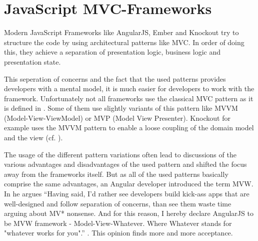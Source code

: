 \section{JavaScript MVC-Frameworks}

Modern JavaScript Frameworks like AngularJS, Ember and Knockout try to structure the code by using architectural patterns like MVC.
In order of doing this, they achieve a separation of presentation logic, business logic and presentation state.

This seperation of concerns and the fact that the used patterns provides developers with a mental model, it is much easier for developers to work with the framework.
Unfortunately not all frameworks use the classical MVC pattern as it is defined in \autocite[]{smalltalk_mvc}.
Some of them use slightly variants of this pattern like MVVM (Model-View-ViewModel) or MVP (Model View Presenter).
Knockout for example uses the MVVM pattern to enable a loose coupling of the domain model and the view (cf.
\autocite{heise_knockout}).
 
The usage of the different pattern variations often lead to discussions of the various advantages and disadvantages of the used pattern and shifted the focus away from the frameworks itself.
But as all of the used patterns basically comprise the same advantages, an Angular developer introduced the term MVW.
In \autocite{anguler_mvw} he argues \enquote{Having said, I'd rather see developers build kick-ass apps that are well-designed and follow separation of concerns, than see them waste time arguing about MV* nonsense.
And for this reason, I hereby declare AngularJS to be MVW framework - Model-View-Whatever.
Where Whatever stands for "whatever works for you".} \autocite[]{anguler_mvw}.
This opinion finds more and more acceptance.

